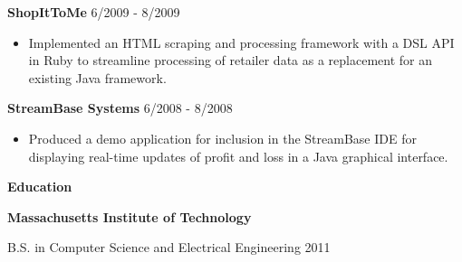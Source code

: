 \documentclass{article}
\begin{document}
{
	\hspace{2mm}
	{\bf ShopItToMe}
	\hfill
	6/2009 - 8/2009
}

\begin{adjustwidth}{4mm}{5mm}
	\begin{itemize}
		\setlength\itemsep{-0.25mm}
		\item Implemented an HTML scraping and processing framework with a DSL API in Ruby to streamline processing of retailer data as a replacement for an existing Java framework.
	\end{itemize}
\end{adjustwidth}

\vspace{2mm}

{
	\hspace{2mm}
	{\bf StreamBase Systems}
	\hfill
	6/2008 - 8/2008
}

\begin{adjustwidth}{4mm}{5mm}
	\begin{itemize}
		\setlength\itemsep{-0.25mm}
		\item Produced a demo application for inclusion in the StreamBase IDE for displaying real-time updates of profit and loss in a Java graphical interface.
	\end{itemize}
\end{adjustwidth}

\vspace{4mm}

{\large\bf Education}\\

\vspace{-2mm}

{
	\hspace{2mm}
	{\bf Massachusetts Institute of Technology}
}

{
	\hspace{2mm}
	B.S. in Computer Science and Electrical Engineering 2011
}
\end{document}

